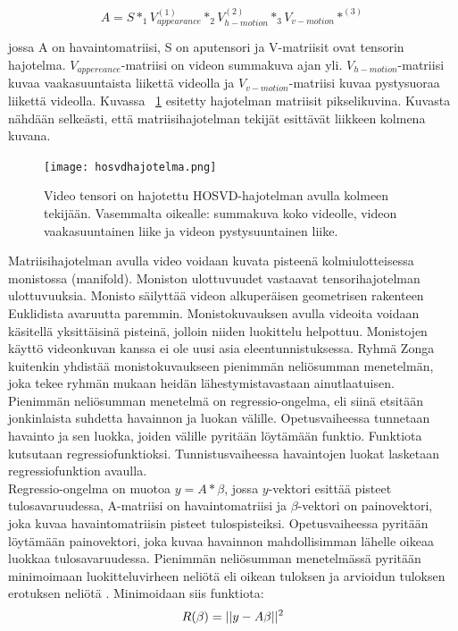 \begin{equation}
A = S *_{1} V_{appearance}^{(1)} *_{2} V_{h-motion}^{(2)} *_{3} V_{v-motion}*^{(3)}
\end{equation}

jossa A on havaintomatriisi, S on aputensori ja V-matriisit ovat tensorin hajotelma. $V_{appereance}$-matriisi on
videon summakuva ajan yli. $V_{h-motion}$-matriisi kuvaa vaakasuuntaista liikettä videolla ja $V_{v-motion}$-matriisi
kuvaa pystysuoraa liikettä videolla. Kuvassa ~\ref{fig:hosvdhajotelma} esitetty hajotelman matriisit pikselikuvina.
Kuvasta nähdään selkeästi, että matriisihajotelman tekijät esittävät liikkeen kolmena kuvana. \citep {6239180}\\

\begin{figure}[htb]
  \begin{center}
    \texttt{[image: hosvdhajotelma.png]}
    \caption{Video tensori on hajotettu HOSVD-hajotelman avulla kolmeen tekijään. Vasemmalta oikealle: summakuva koko videolle, videon vaakasuuntainen liike ja videon pystysuuntainen liike.\citep {6239180}}
    \label{fig:hosvdhajotelma}
  \end{center}
\end{figure}

Matriisihajotelman avulla video voidaan kuvata pisteenä kolmiulotteisessa monistossa (manifold). Moniston ulottuvuudet
vastaavat tensorihajotelman ulottuvuuksia. Monisto säilyttää videon 
alkuperäisen geometrisen rakenteen Euklidista avaruutta paremmin. \citep {Lui2012380} Monistokuvauksen avulla videoita voidaan käsitellä yksittäisinä
pisteinä, jolloin niiden luokittelu helpottuu. Monistojen käyttö videonkuvan kanssa ei ole uusi asia eleentunnistuksessa. 
Ryhmä Zonga kuitenkin yhdistää monistokuvaukseen pienimmän neliösumman menetelmän, joka tekee ryhmän mukaan heidän lähestymistavastaan
ainutlaatuisen.\citep {6239180}\\

Pienimmän neliösumman menetelmä on regressio-ongelma, eli siinä etsitään jonkinlaista suhdetta havainnon ja luokan välille. 
Opetusvaiheessa tunnetaan havainto ja sen luokka, joiden välille pyritään löytämään funktio. Funktiota kutsutaan regressiofunktioksi.
Tunnistusvaiheessa havaintojen luokat lasketaan regressiofunktion avaulla.\citep{leastsquares}\\

Regressio-ongelma on muotoa $y = A * \beta$, jossa $y$-vektori esittää pisteet tulosavaruudessa, A-matriisi on havaintomatriisi 
ja $\beta$-vektori on painovektori, joka kuvaa havaintomatriisin pisteet tulospisteiksi.
Opetusvaiheessa pyritään löytämään painovektori, joka kuvaa havainnon mahdollisimman lähelle oikeaa luokkaa
tulosavaruudessa. \citep {6239180} Pienimmän neliösumman menetelmässä pyritään minimoimaan luokitteluvirheen neliötä eli oikean tuloksen 
ja arvioidun tuloksen erotuksen neliötä \citep{leastsquares}.
Minimoidaan siis funktiota:
\begin{equation}
R(\beta) = ||y-A\beta||^2 \\
\end{equation}

